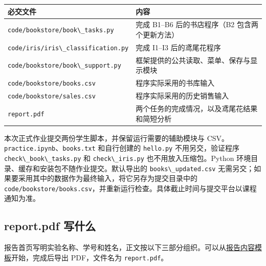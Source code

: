 \documentclass[UTF8,a4paper,11pt,fontset=fandol]{ctexart}
\providecommand{\passthrough}[1]{#1}
\begin{document}
\begin{longtable}[]{@{}
  >{\raggedright\arraybackslash}p{}
  >{\raggedright\arraybackslash}p{}@{}}
\toprule\noalign{}
\begin{minipage}[b]{\linewidth}\raggedright
必交文件
\end{minipage} & \begin{minipage}[b]{\linewidth}\raggedright
内容
\end{minipage} \\
\midrule\noalign{}
\endhead
\bottomrule\noalign{}
\endlastfoot
\passthrough{\lstinline!code/bookstore/book\_tasks.py!} & 完成 B1--B6 后的书店程序（B2 包含两个更新方法） \\
\passthrough{\lstinline!code/iris/iris\_classification.py!} & 完成 I1--I3 后的鸢尾花程序 \\
\passthrough{\lstinline!code/bookstore/book\_support.py!} & 框架提供的公共读取、菜单、保存与显示模块 \\
\passthrough{\lstinline!code/bookstore/books.csv!} & 程序实际采用的书库输入 \\
\passthrough{\lstinline!code/bookstore/sales.csv!} & 程序实际采用的历史销售输入 \\
\passthrough{\lstinline!report.pdf!} & 两个任务的完成情况，以及鸢尾花结果和简短分析 \\
\end{longtable}

本次正式作业提交两份学生脚本，并保留运行需要的辅助模块与 CSV。\passthrough{\lstinline!practice.ipynb!}、\passthrough{\lstinline!books.txt!} 和自行创建的 \passthrough{\lstinline!hello.py!} 不用另交，验证程序 \passthrough{\lstinline!check\_book\_tasks.py!} 和 \passthrough{\lstinline!check\_iris.py!} 也不用放入压缩包。Python 环境目录、缓存和安装包不随作业提交。默认导出的 \passthrough{\lstinline!books\_updated.csv!} 无需另交；如果要采用其中的数据作为最终输入，将它另存为提交目录中的 \passthrough{\lstinline!code/bookstore/books.csv!}，并重新运行检查。具体截止时间与提交平台以课程通知为准。

\subsection{report.pdf 写什么}\label{report.pdf-ux5199ux4ec0ux4e48}

报告首页写明实验名称、学号和姓名，正文按以下三部分组织。可以从\href{report-template.md}{报告内容模板}开始，完成后导出 PDF，文件名为 \passthrough{\lstinline!report.pdf!}。
\end{document}
